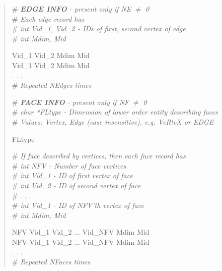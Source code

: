 \documentclass[12pt]{article}
\begin{document}
\begin{verse}
\# \textit{\textbf{EDGE INFO} - present only if NE $\ne$ 0} \\
\# \textit{Each edge record has} \\
\# \textit{int Vid\_1, Vid\_2  - IDs of first, second vertex of edge} \\
\# \textit{int Mdim, Mid}
\vspace{1ex}

Vid\_1 \hspace{0.5ex} Vid\_2 \hspace{0.5ex} Mdim \hspace{0.5ex} Mid \\
Vid\_1 \hspace{0.5ex} Vid\_2 \hspace{0.5ex} Mdim \hspace{0.5ex} Mid \\
. . . \\
\# \textit{Repeated NEdges times}
\vspace{2ex}

\newpage
\# \textit{\textbf{FACE INFO} - present only if NF $\ne$ 0} \\
\# \textit{char *FLtype - Dimension of lower order entity describing faces} \\
\# \textit{Values: Vertex, Edge (case insensitive), e.g. VeRteX or EDGE} \\
\vspace{1ex}

FLtype 
\vspace{1ex}

\# \textit{If face described by vertices, then each face record has} \\
\# \textit{int NFV - Number of face vertices} \\
\# \textit{int Vid\_1 - ID of first vertex of face} \\
\# \textit{int Vid\_2 - ID of second vertex of face} \\
\# . . . \\
\# \textit{int Vid\_1 - ID of NFV'th vertex of face} \\
\# \textit{int Mdim, Mid} 
\vspace{1ex}

NFV \hspace{0.5ex} Vid\_1 \hspace{0.5ex} Vid\_2 \hspace{0.5ex} ... \hspace{0.5ex} Vid\_NFV \hspace{0.5ex} Mdim \hspace{0.5ex} Mid \\
NFV \hspace{0.5ex} Vid\_1 \hspace{0.5ex} Vid\_2 \hspace{0.5ex} ... \hspace{0.5ex} Vid\_NFV \hspace{0.5ex} Mdim \hspace{0.5ex} Mid \\
. . . \\
\# \textit{Repeated NFaces times}
\vspace{2ex}\vspace{1ex}


\end{verse}
\end{document}
